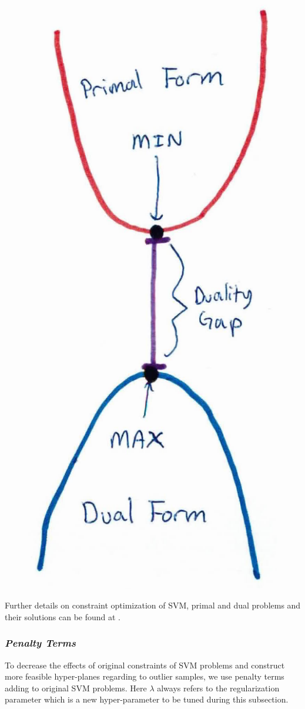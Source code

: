 \begin{figure}[h]
	\centering
	\includegraphics[width=.2\linewidth]{fig/duality_gap.jpg}
	\vspace*{2mm}
	\label{fig:duality_gap}
\end{figure}

Further details on constraint optimization of SVM, primal and dual problems and their solutions can be found at  \cite[pg.~13-19]{svm_book}.

\subsubsection*{\textit{Penalty Terms}}
To decrease the effects of original constraints of SVM problems and construct more feasible hyper-planes regarding to outlier samples, we use penalty terms adding to original SVM problems. Here $\lambda$ always refers to the regularization parameter which is a new hyper-parameter to be tuned during this subsection.

